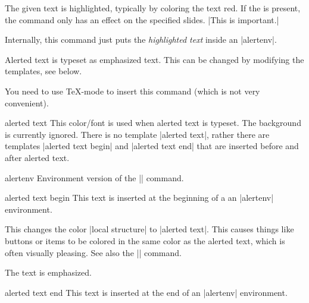 \begin{command}{\alert{}}
  The given text is highlighted, typically by coloring the text red. If
  the  is present, the command only has an
  effect on the specified slides.
  \example |This is \alert{important}.|

  Internally, this command just puts the \emph{highlighted text} inside
  an |alertenv|.

  \articlenote
  Alerted text is typeset as emphasized text. This can be changed by
  modifying the templates, see below.

  \lyxnote
  You need to use \TeX-mode to insert this command (which is not very
  convenient).

  \begin{element}{alerted text}\no\yes\yes
    This color/font is used when alerted text is typeset. The
    background is currently ignored. There is no template
    |alerted text|, rather there are templates |alerted text begin|
    and |alerted text end| that are inserted before and after alerted
    text.
  \end{element}
\end{command}

\begin{environment}{{alertenv}}
  Environment version of the |\alert| command.

  \begin{element}{alerted text begin}\yes\no\no
    This text is inserted at the beginning of a an |alertenv|
    environment.

    \begin{templateoptions}

      \beamernote
      This changes the color |local structure| to |alerted text|. This
      causes things like buttons or items to be colored in the same
      color as the alerted text, which is often visually pleasing. See
      also the |\structure| command.

      \articlenote
      The text is emphasized.
    \end{templateoptions}
  \end{element}

  \begin{element}{alerted text end}\yes\no\no
    This text is inserted at the end of an |alertenv| environment.
  \end{element}
\end{environment}




